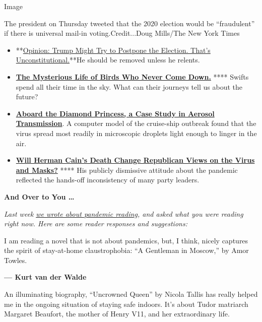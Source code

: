 Image

The president on Thursday tweeted that the 2020 election would be
``fraudulent'' if there is universal mail-in voting.Credit...Doug
Mills/The New York Times

\begin{itemize}
\item
  **\href{https://www.nytimes.com/2020/07/30/opinion/trump-delay-election-coronavirus.html}{Opinion:
  Trump Might Try to Postpone the Election. That's
  Unconstitutional.}**He should be removed unless he relents.
\item
  \textbf{\href{https://www.nytimes.com/2020/07/29/magazine/vesper-flights.html?action=click\&module=Editors\%20Picks\&pgtype=Homepage}{The
  Mysterious Life of Birds Who Never Come Down.}} **** Swifts spend all
  their time in the sky. What can their journeys tell us about the
  future?
\item
  \textbf{\href{https://www.nytimes.com/2020/07/30/health/diamond-princess-coronavirus-aerosol.html}{Aboard
  the Diamond Princess, a Case Study in Aerosol Transmission}}. A
  computer model of the cruise-ship outbreak found that the virus spread
  most readily in microscopic droplets light enough to linger in the
  air.
\item
  \textbf{\href{https://www.nytimes.com/2020/07/30/us/politics/herman-cain-gop-coronavirus.html}{Will
  Herman Cain's Death Change Republican Views on the Virus and Masks?}}
  **** His publicly dismissive attitude about the pandemic reflected the
  hands-off inconsistency of many party leaders.
\end{itemize}

\textbf{And Over to You \ldots{}}

\emph{Last week}
\href{https://www.nytimes.com/2020/07/24/world/australia/divisions-decency-and-the-plague.html}{\emph{we
wrote about pandemic reading}}\emph{, and asked what you were reading
right now. Here are some reader responses and suggestions:}

I am reading a novel that is not about pandemics, but, I think, nicely
captures the spirit of stay-at-home claustrophobia: ``A Gentleman in
Moscow,'' by Amor Towles.

\textbf{--- Kurt van der Walde}

An illuminating biography, ``Uncrowned Queen'' by Nicola Tallis has
really helped me in the ongoing situation of staying safe indoors. It's
about Tudor matriarch Margaret Beaufort, the mother of Henry V11, and
her extraordinary life.

